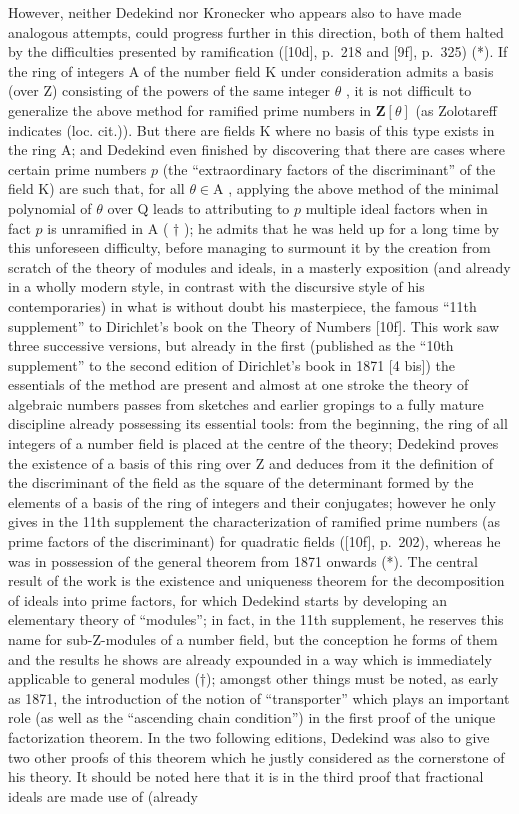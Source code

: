 However, neither Dedekind nor Kronecker who appears also to have made analogous attempts, could progress further in this direction, both of them halted by the difficulties presented by ramification ({[}10d{]}, p.~218 and {[}9f{]}, p.~325) (*). If the ring of integers A of the number field K under consideration admits a basis (over Z) consisting of the powers of the same integer \(\theta\) , it is not difficult to generalize the above method for ramified prime numbers in \(\mathbf{Z}[\theta]\) (as Zolotareff indicates (loc. cit.)). But there are fields K where no basis of this type exists in the ring A; and Dedekind even finished by discovering that there are cases where certain prime numbers \(p\) (the ``extraordinary factors of the discriminant'' of the field K) are such that, for all \(\theta \in \mathrm{A}\) , applying the above method of the minimal polynomial of \(\theta\) over Q leads to attributing to \(p\) multiple ideal factors when in fact \(p\) is unramified in A ( \(\dagger\) ); he admits that he was held up for a long time by this unforeseen difficulty, before managing to surmount it by the creation from scratch of the theory of modules and ideals, in a masterly exposition (and already in a wholly modern style, in contrast with the discursive style of his contemporaries) in what is without doubt his masterpiece, the famous ``11th supplement'' to Dirichlet's book on the Theory of Numbers {[}10f{]}. This work saw three successive versions, but already in the first (published as the ``10th supplement'' to the second edition of Dirichlet's book in 1871 {[}4 bis{]}) the essentials of the method are present and almost at one stroke the theory of algebraic numbers passes from sketches and earlier gropings to a fully mature discipline already possessing its essential tools: from the beginning, the ring of all integers of a number field is placed at the centre of the theory; Dedekind proves the existence of a basis of this ring over Z and deduces from it the definition of the discriminant of the field as the square of the determinant formed by the elements of a basis of the ring of integers and their conjugates; however he only gives in the 11th supplement the characterization of ramified prime numbers (as prime factors of the discriminant) for quadratic fields ({[}10f{]}, p.~202), whereas he was in possession of the general theorem from 1871 onwards (*). The central result of the work is the existence and uniqueness theorem for the decomposition of ideals into prime factors, for which Dedekind starts by developing an elementary theory of ``modules''; in fact, in the 11th supplement, he reserves this name for sub-Z-modules of a number field, but the conception he forms of them and the results he shows are already expounded in a way which is immediately applicable to general modules (†); amongst other things must be noted, as early as 1871, the introduction of the notion of ``transporter'' which plays an important role (as well as the ``ascending chain condition'') in the first proof of the unique factorization theorem. In the two following editions, Dedekind was also to give two other proofs of this theorem which he justly considered as the cornerstone of his theory. It should be noted here that it is in the third proof that fractional ideals are made use of (already 
